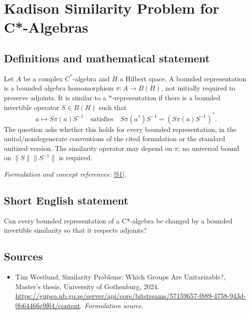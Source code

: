 \documentclass[11pt]{article}
\begin{document}
\section*{\texorpdfstring{Kadison Similarity Problem for C*-Algebras}{Kadison Similarity Problem for C*-Algebras}}\label{30006814}
\subsection{Definitions and mathematical statement}
Let $A$ be a complex $C^*$-algebra and $H$ a Hilbert space. A bounded representation is a bounded algebra homomorphism $\pi:A\to B(H)$, not initially required to preserve adjoints. It is similar to a $*$-representation if there is a bounded invertible operator $S\in B(H)$ such that
\[
 a\longmapsto S\pi(a)S^{-1}
 \quad\text{satisfies}\quad
 S\pi(a^*)S^{-1}=(S\pi(a)S^{-1})^*.
\]
The question asks whether this holds for every bounded representation, in the unital/nondegenerate conventions of the cited formulation or the standard unitized version. The similarity operator may depend on $\pi$; no universal bound on $\|S\|\|S^{-1}\|$ is required.
\par\smallskip\textit{Formulation and concept references:} \href{https://gupea.ub.gu.se/server/api/core/bitstreams/57159657-f889-4758-943d-0b64466e9f64/content}{[S1]}.

\subsection{Short English statement}
Can every bounded representation of a C*-algebra be changed by a bounded invertible similarity so that it respects adjoints?
\subsection{Sources}
\begin{itemize}
\item[S1]Tim Westlund, Similarity Problems: Which Groups Are Unitarizable?, Master's thesis, University of Gothenburg, 2024.
\url{https://gupea.ub.gu.se/server/api/core/bitstreams/57159657-f889-4758-943d-0b64466e9f64/content}.
\textit{Formulation source.}
\end{itemize}
\end{document}
